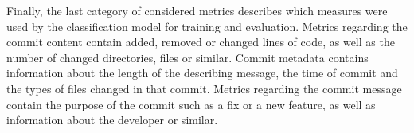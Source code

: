 Finally, the last category of considered metrics describes which measures were used by the classification model for training and evaluation. Metrics regarding the commit content contain added, removed or changed lines of code, as well as the number of changed directories, files or similar. Commit metadata contains information about the length of the describing message, the time of commit and the types of files changed in that commit. Metrics regarding the commit message contain the purpose of the commit such as a fix or a new feature, as well as information about the developer or similar.



